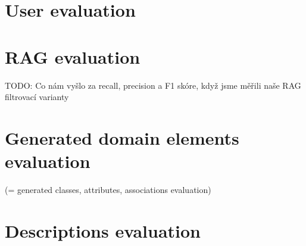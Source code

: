 \section{User evaluation}

\section{RAG evaluation}
TODO: Co nám vyšlo za recall, precision a F1 skóre, když jsme měřili naše RAG filtrovací varianty

\section{Generated domain elements evaluation}
(= generated classes, attributes, associations evaluation)

\section{Descriptions evaluation}
